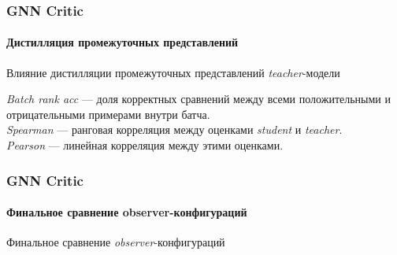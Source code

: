 \documentclass[aspectratio=169]{beamer}
\begin{document}
\begin{frame}
\frametitle{GNN Critic}
\framesubtitle{Дистилляция промежуточных представлений}
\begin{table}[htbp]
\centering
{\normalsize Влияние дистилляции промежуточных представлений \textit{teacher}-модели}\\[0.25cm]
\label{tab:student-intermediate-ablation}
\scriptsize
{}
\end{table}
{\fontsize{6.9}{7.8}\selectfont
\textit{Batch rank acc} --- доля корректных сравнений между всеми положительными и отрицательными примерами внутри батча.\\[0.03cm]
\textit{Spearman} --- ранговая корреляция между оценками \textit{student} и \textit{teacher}.\\[0.03cm]
\textit{Pearson} --- линейная корреляция между этими оценками.\\[0.03cm]
}
\end{frame}

\begin{frame}
\frametitle{GNN Critic}
\framesubtitle{Финальное сравнение observer-конфигураций}
\begin{table}[htbp]
\centering
{\normalsize Финальное сравнение \textit{observer}-конфигураций}\\[0.25cm]
\label{tab:observer-final-comparison}
\scriptsize
{}
\end{table}
\end{frame}
\end{document}
